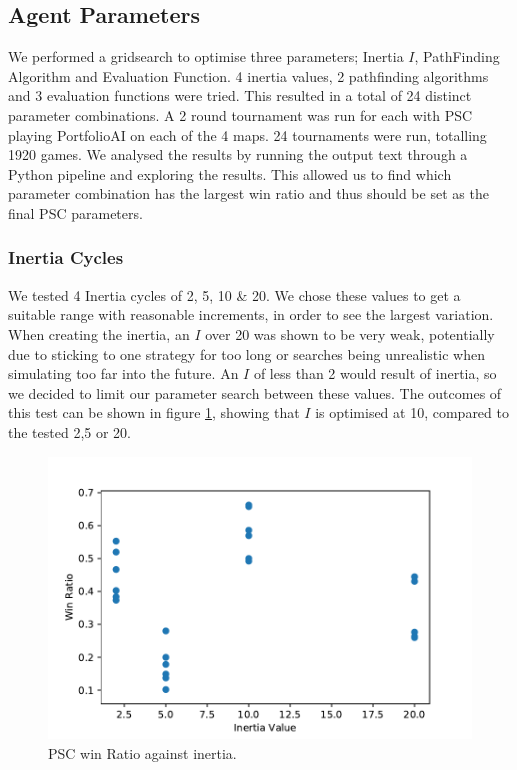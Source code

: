 \documentclass[]{article}
\begin{document}
\subsection{Agent Parameters}

We performed a gridsearch to optimise three parameters; Inertia $I$, PathFinding Algorithm and Evaluation Function. 
4 inertia values, 2 pathfinding algorithms and 3 evaluation functions were tried. This resulted in a total of 24 distinct parameter combinations. A 2 round tournament was run for each with PSC playing PortfolioAI on each of the 4 maps. 24 tournaments were run, totalling 1920 games. We analysed the results by running the output text through a Python pipeline and exploring the results. This allowed us to find which parameter combination has the largest win ratio and thus should be set as the final PSC parameters.

\subsubsection{Inertia Cycles}

We tested 4 Inertia cycles of 2, 5, 10 \& 20. We chose these values to get a suitable range with reasonable increments, in order to see the largest variation. 
When creating the inertia, an $I$ over 20 was shown to be very weak, potentially due to sticking to one strategy for too long or searches being unrealistic when simulating too far into the future. An $I$ of less than 2 would result of inertia, so we decided to limit our parameter search between these values. The outcomes of this test can be shown in figure \ref{fig:WinRatioAgainstInertia}, showing that $I$ is optimised at 10, compared to the tested 2,5 or 20.

\begin{figure}
	\includegraphics[width=\linewidth]{WinRatioAgainstInertia.pdf}
	\caption{PSC win Ratio against inertia.}
	\label{fig:WinRatioAgainstInertia}
\end{figure}
\end{document}
